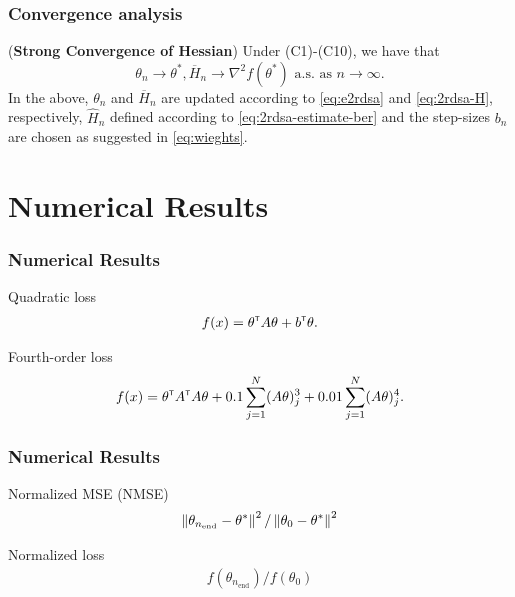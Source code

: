 \begin{frame}
\begin{small}
\frametitle{\centering Convergence analysis}
\begin{theorem}(\textbf{Strong Convergence of Hessian})
\label{thm:2rdsa-H}
Under (C1)-(C10), we have that 
$$\theta_n \rightarrow \theta^*, \overline H_n \rightarrow \nabla^2 f(\theta^*) \text{ a.s. as } n\rightarrow \infty.$$ 
In the above, $\theta_n$ and $\overline H_n$ are updated according to \eqref{eq:e2rdsa} and \eqref{eq:2rdsa-H}, respectively, $\widehat H_n$ defined according to \eqref{eq:2rdsa-estimate-ber} and the step-sizes $b_n$ are chosen as suggested in \eqref{eq:wieghts}. 
\end{theorem}
\end{small}
\end{frame}

\section{Numerical Results}
\begin{frame}
\begin{small}
\frametitle{\centering Numerical Results}
\begin{block}{Quadratic loss}
\begin{align}
f(x) = \theta^\mathsf{\scriptscriptstyle T} A \theta + b^\mathsf{\scriptscriptstyle T} \theta.\label{eq:quadratic}
\end{align}
\end{block}
\begin{block}{Fourth-order loss}
\begin{align} 
f(x) = \theta^\mathsf{\scriptscriptstyle T} A^\mathsf{\scriptscriptstyle T} A \theta + 0.1 \sum_{j=1}^N (A\theta)^3_j + 0.01 \sum_{j=1}^N (A\theta)^4_j.\label{eq:4thorder}
 \end{align} 
 \end{block}
 \end{small}
\end{frame}

\begin{frame}
\begin{small}
\frametitle{\centering Numerical Results}
\begin{block}{Normalized MSE (NMSE) }
\begin{align}
\left\| \theta_{n_\text{end}} - \theta^* \right\|^2 / \left\| \theta_0 - \theta^*\right\|^2
\end{align}
\end{block}
\begin{block}{ Normalized loss}
\begin{align} 
f(\theta_{n_\text{end}})/f(\theta_0)
 \end{align} 
 \end{block}
 \end{small}
\end{frame}


